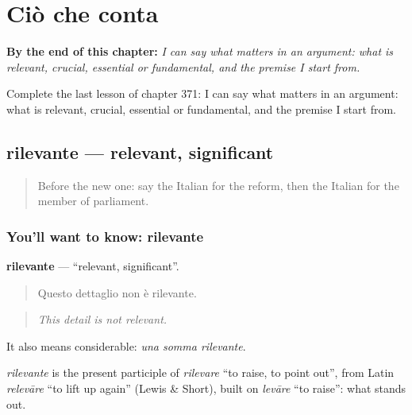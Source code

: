 
\chapter{Ciò che conta}
\label{ch:it-cio-che-conta}

\begin{chapteropening}
\textbf{By the end of this chapter:} \emph{I can say what matters in an argument: what is relevant, crucial, essential or fundamental, and the premise I start from.}

Complete the last lesson of chapter 371: I can say what matters in an argument: what is relevant, crucial, essential or fundamental, and the premise I start from.
\end{chapteropening}

\section[rilevante]{rilevante — relevant, significant}

\label{lesson:IT-C371-rilevante}



\begin{quote}
Before the new one: say the Italian for the reform, then the Italian for the member of parliament.
\end{quote}

\subsection*{You'll want to know: rilevante}
\textbf{rilevante} — \textquotedblleft{}relevant, significant\textquotedblright{}.

\begin{quote}
Questo dettaglio non è rilevante.
\end{quote}

\begin{quote}
\emph{This detail is not relevant.}
\end{quote}

It also means considerable: \emph{una somma rilevante}.

\begin{cousinweb}
\emph{rilevante} is the present participle of \emph{rilevare} \textquotedblleft{}to raise, to point out\textquotedblright{}, from Latin \emph{relevāre} \textquotedblleft{}to lift up again\textquotedblright{} (Lewis \& Short), built on \emph{levāre} \textquotedblleft{}to raise\textquotedblright{}: what stands out.
\end{cousinweb}


